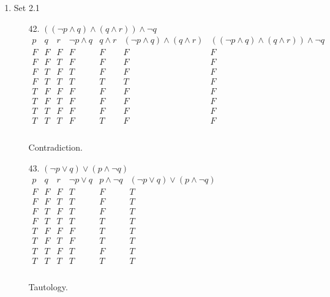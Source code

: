 \documentclass[letterpaper]{article}
\begin{document}
\begin{enumerate}
\begin{enumerate}
			\item Set 2.1
			\begin{itemize}
				\item [42.]
				$\left( \left( \neg p \wedge q \right) \wedge \left( q \wedge r \right) \right) \wedge \neg q$ \\
				$\begin{array}{c|c|c|c|c|c|c}
					p & q & r & \neg p \wedge q & q \wedge r & \left( \neg p \wedge q \right) \wedge \left( q \wedge r \right) & \left( \left( \neg p \wedge q \right) \wedge \left( q \wedge r \right) \right) \wedge \neg q \\ \hline
					F & F & F & F & F & F & F \\ \hline
					F & F & T & F & F & F & F \\ \hline
					F & T & F & T & F & F & F \\ \hline
					F & T & T & T & T & T & F \\ \hline
					T & F & F & F & F & F & F \\ \hline
					T & F & T & F & F & F & F \\ \hline
					T & T & F & F & F & F & F \\ \hline
					T & T & T & F & T & F & F \\ 
				\end{array}$ \\
				\\
				Contradiction.
				
				\item [43.]
				$\left( \neg p \vee q \right) \vee \left( p \wedge \neg q \right)$ \\
				$\begin{array}{c|c|c|c|c|c}
					p & q & r & \neg p \vee q & p \wedge \neg q & \left( \neg p \vee q \right) \vee \left( p \wedge \neg q \right) \\ \hline
					F & F & F & T & F & T  \\ \hline
					F & F & T & T & F & T  \\ \hline
					F & T & F & T & F & T  \\ \hline
					F & T & T & T & T & T  \\ \hline
					T & F & F & F & T & T  \\ \hline
					T & F & T & F & T & T  \\ \hline
					T & T & F & T & F & T  \\ \hline
					T & T & T & T & T & T  \\ 
				\end{array}$ \\
				\\
				Tautology.
			\end{itemize}
			

\end{enumerate}
\end{enumerate}
\end{document}
